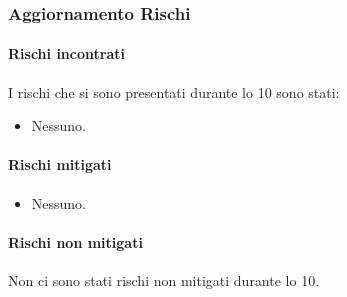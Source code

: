 \subsubsection{Aggiornamento Rischi}
\label{sec:aggiornamento_rischi_sprint10}

\paragraph{Rischi incontrati}
\label{par:rischi_incontrati_sprint10}
I rischi che si sono presentati durante lo  10 sono stati:
\begin{itemize}
    \item Nessuno.
\end{itemize}

\paragraph{Rischi mitigati}
\label{par:rischi_mitigati_sprint10}
\begin{itemize}
    \item Nessuno.
\end{itemize}

\paragraph{Rischi non mitigati}
\label{par:rischi_non_mitigati_sprint10}
Non ci sono stati rischi non mitigati durante lo  10.
